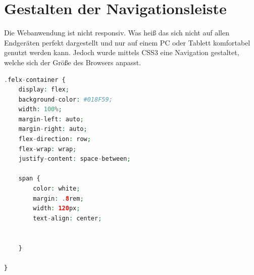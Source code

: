 \section{Gestalten der Navigationsleiste}
Die Webanwendung ist nicht responsiv. Was heiß das sich nicht auf allen Endgeräten perfekt dargestellt und nur auf einem PC oder Tablett komfortabel genutzt werden kann. Jedoch wurde mittels \ac{CSS}3 eine Navigation gestaltet, welche sich der Größe des Browsers anpasst.


\begin{lstlisting}[language=php, frame=single]
.felx-container {
	display: flex;
	background-color: #018F59;
	width: 100%;
	margin-left: auto;
	margin-right: auto;
	flex-direction: row;
	flex-wrap: wrap;
	justify-content: space-between;
	
	span {
		color: white;
		margin: .8rem;
		width: 120px;
		text-align: center;
		
		
	}
	
}

\end{lstlisting}